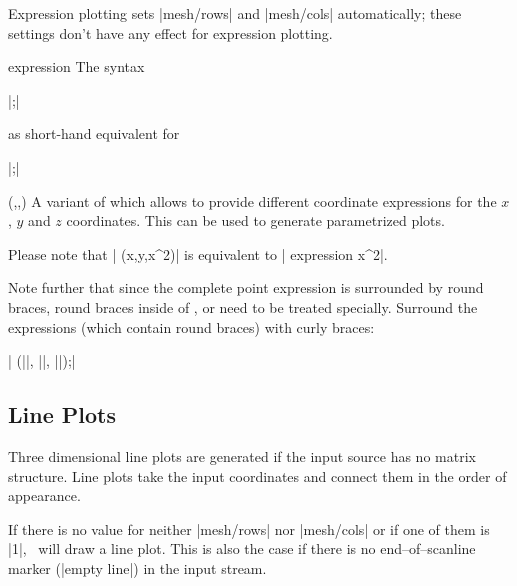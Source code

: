 {\begin{addplot3operation}[]{}{}
	Expression plotting sets |mesh/rows| and |mesh/cols| automatically; these settings don't have any effect for expression plotting.
\end{addplot3operation}

\begin{addplot3operation}[]{expression}{}
	The syntax

	 |;|

	as short-hand equivalent for

	 |;|
\end{addplot3operation}

\begin{addplot3operation}[]{(,,)}{}
	A variant of  which allows to provide different coordinate expressions for the $x$, $y$ and $z$ coordinates. This can be used to generate parametrized plots.

	Please note that | (x,y,x^2)| is equivalent to | expression {x^2}|.

	Note further that since the complete point expression is surrounded by round braces, round braces inside of ,  or  need to be treated specially. Surround the expressions (which contain round braces) with curly braces:

	| (||, ||, ||);|
\end{addplot3operation}

\subsection{Line Plots}
\label{sec:pgfplots:lineplots}

Three dimensional line plots are generated if the input source has no matrix structure. Line plots take the input coordinates and connect them in the order of appearance.

\begin{codeexample}[]
\end{codeexample}
If there is no value for neither |mesh/rows| nor |mesh/cols| or if one of them is |1|, \PGFPlots\ will draw a line plot. This is also the case if there is no end--of--scanline marker (|empty line|) in the input stream.

}
